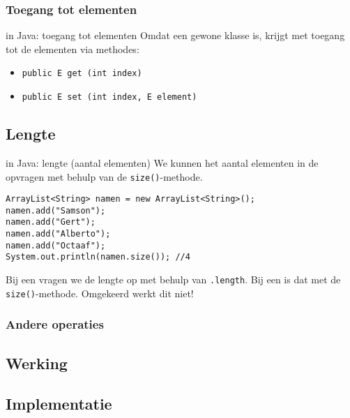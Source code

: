 \subsubsection{Toegang tot elementen}
\begin{frame}[fragile]{\dsarraylist{} in Java: toegang tot elementen}
Omdat \dsarraylist{} een gewone klasse is, krijgt met toegang tot de elementen via methodes:
\begin{itemize}
 \item \texttt{public E get (int index)}
 \item \texttt{public E set (int index, E element)}
\end{itemize}
\end{frame}
\subsection{Lengte}
\begin{frame}[fragile]{\dsarraylist{} in Java: lengte (aantal elementen)}
We kunnen het aantal elementen in de \dsarraylist{} opvragen met behulp van de \texttt{size()}-methode.
\begin{example}
\begin{lstlisting}
ArrayList<String> namen = new ArrayList<String>();
namen.add("Samson");
namen.add("Gert");
namen.add("Alberto");
namen.add("Octaaf");
System.out.println(namen.size()); //4
\end{lstlisting}
\end{example}
\begin{letop}
Bij een \dsarray{} vragen we de lengte op met behulp van \texttt{.length}. Bij een \dsarraylist{} is dat met de \texttt{size()}-methode. Omgekeerd werkt dit niet!
\end{letop}
\end{frame}
\subsubsection{Andere operaties}
\subsection{Werking}
\subsection{Implementatie}